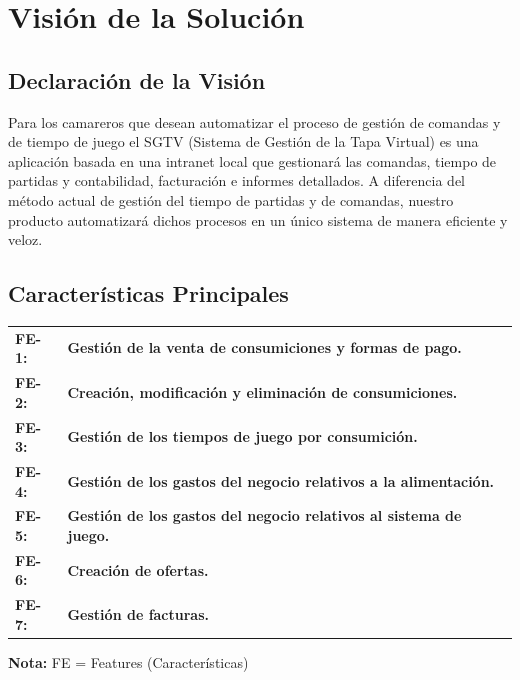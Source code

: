 \documentclass[a4paper,11pt]{article}
\begin{document}
	\section{Visión de la Solución}
		\subsection{Declaración de la Visión}
			Para los camareros que desean automatizar el proceso de gestión de comandas y de tiempo de juego el SGTV 					(Sistema de Gestión de la Tapa Virtual) es una aplicación basada en una intranet local que gestionará las 						comandas, tiempo de partidas y contabilidad, facturación e informes detallados. A diferencia del método actual 					de gestión del tiempo de partidas y de comandas, nuestro producto automatizará dichos procesos en un único 					sistema de manera eficiente y veloz.
		\subsection{Características Principales}
			\begin{center}
				\begin{tabular}{l p{11cm}}
					\textbf{FE-1:} & \textbf{Gestión de la venta de consumiciones y formas de pago.}\\
					\textbf{FE-2:} & \textbf{Creación, modificación y eliminación de consumiciones.} \\
					\textbf{FE-3:} & \textbf{Gestión de los tiempos de juego por consumición.} \\
					\textbf{FE-4:} & \textbf{Gestión de los gastos del negocio relativos a la alimentación.}\\
					\textbf{FE-5:} & \textbf{Gestión de los gastos del negocio relativos al sistema de juego.} \\
					\textbf{FE-6:} & \textbf{Creación de ofertas.} \\
					\textbf{FE-7:} & \textbf{Gestión de facturas.}\\
				\end{tabular}
			\end{center}
			\textbf{Nota:} FE = Features (Características)
\end{document}
